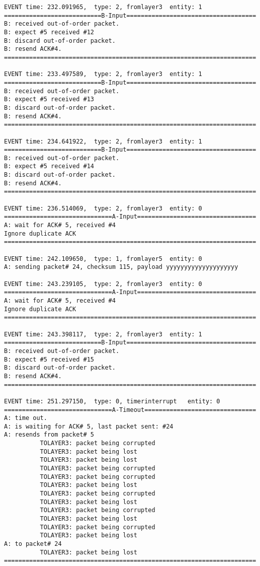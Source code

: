\documentclass[12pt]{article}
\begin{document}
\begin{verbatim}
EVENT time: 232.091965,  type: 2, fromlayer3  entity: 1
===========================B-Input====================================
B: received out-of-order packet.
B: expect #5 received #12
B: discard out-of-order packet.
B: resend ACK#4.
======================================================================

EVENT time: 233.497589,  type: 2, fromlayer3  entity: 1
===========================B-Input====================================
B: received out-of-order packet.
B: expect #5 received #13
B: discard out-of-order packet.
B: resend ACK#4.
======================================================================

EVENT time: 234.641922,  type: 2, fromlayer3  entity: 1
===========================B-Input====================================
B: received out-of-order packet.
B: expect #5 received #14
B: discard out-of-order packet.
B: resend ACK#4.
======================================================================

EVENT time: 236.514069,  type: 2, fromlayer3  entity: 0
==============================A-Input=================================
A: wait for ACK# 5, received #4
Ignore duplicate ACK
======================================================================

EVENT time: 242.109650,  type: 1, fromlayer5  entity: 0
A: sending packet# 24, checksum 115, payload yyyyyyyyyyyyyyyyyyyy

EVENT time: 243.239105,  type: 2, fromlayer3  entity: 0
==============================A-Input=================================
A: wait for ACK# 5, received #4
Ignore duplicate ACK
======================================================================

EVENT time: 243.398117,  type: 2, fromlayer3  entity: 1
===========================B-Input====================================
B: received out-of-order packet.
B: expect #5 received #15
B: discard out-of-order packet.
B: resend ACK#4.
======================================================================

EVENT time: 251.297150,  type: 0, timerinterrupt   entity: 0
==============================A-Timeout===============================
A: time out. 
A: is waiting for ACK# 5, last packet sent: #24
A: resends from packet# 5 
          TOLAYER3: packet being corrupted
          TOLAYER3: packet being lost
          TOLAYER3: packet being lost
          TOLAYER3: packet being corrupted
          TOLAYER3: packet being corrupted
          TOLAYER3: packet being lost
          TOLAYER3: packet being corrupted
          TOLAYER3: packet being lost
          TOLAYER3: packet being corrupted
          TOLAYER3: packet being lost
          TOLAYER3: packet being corrupted
          TOLAYER3: packet being lost
A: to packet# 24
          TOLAYER3: packet being lost
======================================================================


\end{verbatim}
\end{document}
